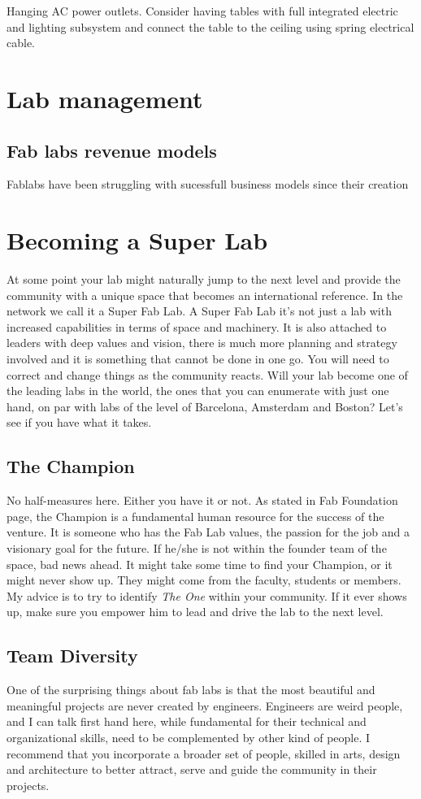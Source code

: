\documentclass[a4paper,12pt,titlepage]{article}
\begin{document}
Hanging AC power outlets. Consider having tables with full integrated electric and lighting subsystem and connect the table to the ceiling using spring electrical cable.

\section{Lab management}

\subsection{Fab labs revenue models}
Fablabs have been struggling with sucessfull business models since their creation

\section{Becoming a Super Lab}
At some point your lab might naturally jump to the next level and provide the community with a unique space
that becomes an international reference. In the network we call it a Super Fab Lab. A
Super Fab Lab it's not just a lab with increased capabilities in terms of space and
machinery. It is also attached to leaders with  deep values and vision, there is much more planning and strategy involved and it is something that
cannot be done in one go. You will need to correct and change things as the
community reacts. Will your lab become one of the
leading labs in the world, the ones that you can enumerate with just one hand, on par
with labs of the level of Barcelona, Amsterdam and Boston? Let's see if you have what it takes.
\subsection{The Champion}
No half-measures here. Either you have it or not. As stated in Fab Foundation page, the Champion is a fundamental human resource for the success of the
venture. It is someone who has the Fab Lab values, the passion for the job and a visionary goal for
the future. If he/she is not within the founder team of the space, bad news ahead. It might take some time to find your Champion, or it might never show up. They might
come from the faculty, students or members. My advice is to try to identify \textit{The One} within your community. If it
ever shows up, make sure you empower him to lead and drive the lab to the next level.

\subsection{Team Diversity}
One of the surprising things about fab labs is that the most beautiful and meaningful projects are never created by engineers. Engineers are weird people, and I can talk first hand here, while fundamental for their technical and organizational skills, need to be complemented by other kind of people. I
recommend that you incorporate a broader set of people, skilled in arts, design and
architecture to better attract, serve and guide the community in their projects. 
\end{document}
